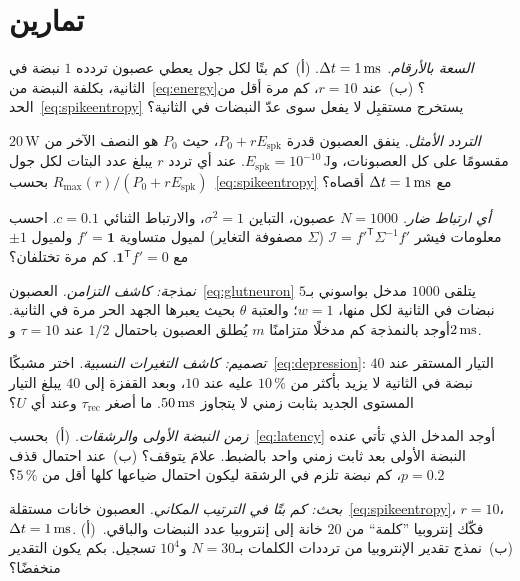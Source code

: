 \section{تمارين}

\begin{exercise}[\lvlA]
\label{ex:04:1}
\emph{السعة بالأرقام.} $\Delta t=1\,\text{ms}$. (أ)~كم بتًا لكل جول يعطي عصبون تردده $1$ نبضة في الثانية، بكلفة النبضة من~\eqref{eq:energy}؟ (ب)~عند $r=10$، كم مرة أقل من الحد~\eqref{eq:spikeentropy} يستخرج مستقبِل لا يفعل سوى عدّ النبضات في الثانية؟
\end{exercise}

\begin{exercise}[\lvlB]
\label{ex:04:2}
\emph{التردد الأمثل.} ينفق العصبون قدرة $P_0+rE_{\text{spk}}$، حيث $P_0$ هو النصف الآخر من $20\,\text{W}$ مقسومًا على كل العصبونات، و$E_{\text{spk}}=10^{-10}\,\text{J}$. عند أي تردد $r$ يبلغ عدد البتات لكل جول $R_{\max}(r)/(P_0+rE_{\text{spk}})$ بحسب~\eqref{eq:spikeentropy} مع $\Delta t=1\,\text{ms}$ أقصاه؟
\end{exercise}

\begin{exercise}[\lvlB]
\label{ex:04:3}
\emph{أي ارتباط ضار.} $N=1000$ عصبون، التباين $\sigma^2=1$، والارتباط الثنائي $c=0.1$. احسب معلومات فيشر $\mathcal I=f'^{\mathsf T}\Sigma^{-1}f'$ ($\Sigma$ مصفوفة التغاير) لميول متساوية $f'=\mathbf 1$ ولميول $\pm1$ مع $\mathbf 1^{\mathsf T}f'=0$. كم مرة تختلفان؟
\end{exercise}

\begin{exercise}[\lvlB]
\label{ex:04:4}
\emph{نمذجة: كاشف التزامن.} العصبون~\eqref{eq:glutneuron} يتلقى $1000$ مدخل بواسوني بـ$5$ نبضات في الثانية لكل منها، $w=1$؛ والعتبة $\theta$ بحيث يعبرها الجهد الحر مرة في الثانية. أوجد بالنمذجة كم مدخلًا متزامنًا $m$ يُطلق العصبون باحتمال $1/2$ عند $\tau=10$ و$2\,\text{ms}$.
\end{exercise}

\begin{exercise}[\lvlB]
\label{ex:04:5}
\emph{تصميم: كاشف التغيرات النسبية.} اختر مشبكًا~\eqref{eq:depression}: التيار المستقر عند $40$ نبضة في الثانية لا يزيد بأكثر من $10\,\%$ عليه عند $10$، وبعد القفزة إلى $40$ يبلغ التيار المستوى الجديد بثابت زمني لا يتجاوز $50\,\text{ms}$. ما أصغر $\tau_{\text{rec}}$ وعند أي $U$؟
\end{exercise}

\begin{exercise}[\lvlA]
\label{ex:04:6}
\emph{زمن النبضة الأولى والرشقات.} (أ)~بحسب~\eqref{eq:latency} أوجد المدخل الذي تأتي عنده النبضة الأولى بعد ثابت زمني واحد بالضبط. علامَ يتوقف؟ (ب)~عند احتمال قذف $p=0.2$، كم نبضة تلزم في الرشقة ليكون احتمال ضياعها كلها أقل من $5\,\%$؟
\end{exercise}

\begin{exercise}[\lvlC]
\label{ex:04:7}
\emph{بحث: كم بتًا في الترتيب المكاني.} العصبون خانات مستقلة~\eqref{eq:spikeentropy}، $r=10$، $\Delta t=1\,\text{ms}$. (أ)~فكّك إنتروبيا ”كلمة“ من $20$ خانة إلى إنتروبيا عدد النبضات والباقي. (ب)~نمذج تقدير الإنتروبيا من ترددات الكلمات بـ$N=30$ و$10^4$ تسجيل. بكم يكون التقدير منخفضًا؟
\end{exercise}
